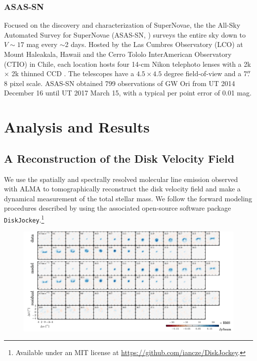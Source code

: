 \documentclass[twocolumn]{aastex61}
\begin{document}
\subsubsection{ASAS-SN}
Focused on the discovery and characterization of SuperNovae, the the All-Sky Automated Survey for SuperNovae (ASAS-SN, \citet{Shappee14}) surveys the entire sky down to $V \sim 17$ mag every $\sim$2 days. Hosted by the Las Cumbres Observatory (LCO) at Mount Haleakala, Hawaii and the Cerro Tololo InterAmerican Observatory (CTIO) in Chile, each location hosts four 14-cm Nikon telephoto lenses with a 2k $\times$ 2k thinned CCD \citep{Brown13}. The telescopes have a $4.5\times4.5$ degree field-of-view and a 7$\mbox{$.\!\!^{\prime\prime}$}$8 pixel scale. ASAS-SN obtained 799 observations of GW Ori from UT 2014 December 16 until UT 2017 March 15, with a typical per point error of 0.01 mag.


\section{Analysis and Results}

\subsection{A Reconstruction of the Disk Velocity Field}
We use the spatially and spectrally resolved molecular line emission observed with ALMA to tomographically reconstruct the disk velocity field and make a dynamical measurement of the total stellar mass. We follow the forward modeling procedures described by \citet{czekala15a,czekala16} using the associated open-source software package {\tt DiskJockey}.\footnote{Available under an MIT license at \url{https://github.com/iancze/DiskJockey}.}

\begin{figure}[ht!]
\begin{center}
  \includegraphics{chmaps_13CO.pdf}
  \end{center}
\end{figure}
\end{document}
